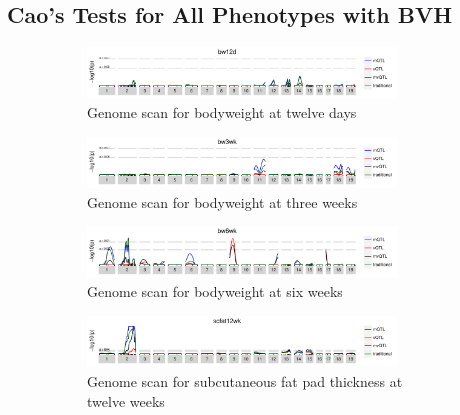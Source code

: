 \FloatBarrier
\clearpage
\subsection{Cao's Tests for All Phenotypes with BVH}
  \begin{figure}[h]
    \begin{subfigure}{\linewidth}
      \centering
      \includegraphics[width = 0.9\textwidth]{images/scan_cao_bw12d.pdf}
      \caption{Genome scan for bodyweight at twelve days}
      \label{fig:bw12d_cao_scan}
    \end{subfigure}
    \begin{subfigure}{\linewidth}
      \centering
      \includegraphics[width = 0.9\textwidth]{images/scan_cao_bw3wk.pdf}
      \caption{Genome scan for bodyweight at three weeks}
      \label{fig:bw3wk_cao_scan}
    \end{subfigure}
    \begin{subfigure}{\linewidth}
      \centering
      \includegraphics[width = 0.9\textwidth]{images/scan_cao_bw6wk.pdf}
      \caption{Genome scan for bodyweight at six weeks}
      \label{fig:bw6wk_cao_scan}
    \end{subfigure}
    \begin{subfigure}{\linewidth}
      \centering
      \includegraphics[width = 0.9\textwidth]{images/scan_cao_scfat12wk.pdf}
      \caption{Genome scan for subcutaneous fat pad thickness at twelve weeks}
      \label{fig:scfat12wk_cao_scan}
    \end{subfigure}
    \begin{subfigure}{\linewidth}

\end{subfigure}
\end{figure}
